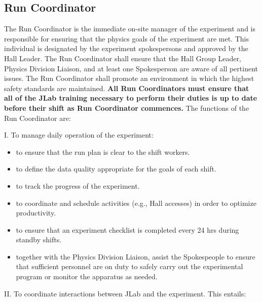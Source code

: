 \documentclass[10pt]{article}
\begin{document}
\subsection{Run Coordinator}

 The Run Coordinator is the  immediate on-site manager of the experiment 
and is responsible for ensuring that the physics goals of the experiment 
are met. This individual is designated by the experiment spokespersons 
and approved by the Hall Leader.  The Run Coordinator shall ensure that 
the Hall Group Leader, Physics Division Liaison, and at least 
one Spokesperson are aware of all pertinent issues. The Run Coordinator
shall promote an environment in which the highest safety
standards are maintained.
{\bf All Run Coordinators must ensure that all of the JLab training necessary to perform 
their duties is up to date before their shift as Run Coordinator commences.}
The functions of the Run Coordinator  are: 

\noindent I. To manage daily operation of the experiment:

\begin{itemize}

\item to ensure that the run plan is clear to the shift workers.

\item to define the data quality appropriate for the goals of each shift.

\item to track the progress of the experiment.

\item to coordinate and schedule activities (e.g.,
Hall accesses) in order to optimize productivity.

\item to ensure that an experiment checklist is completed every 24 hrs during 
standby shifts.

\item together with the Physics Division Liaison, assist the Spokespeople to ensure that sufficient personnel
are on duty to safely carry out the experimental program or monitor the apparatus as needed.

\end{itemize}


\vspace{.25cm}

\noindent II. To coordinate interactions between JLab and the experiment. This
 entails:
\end{document}
